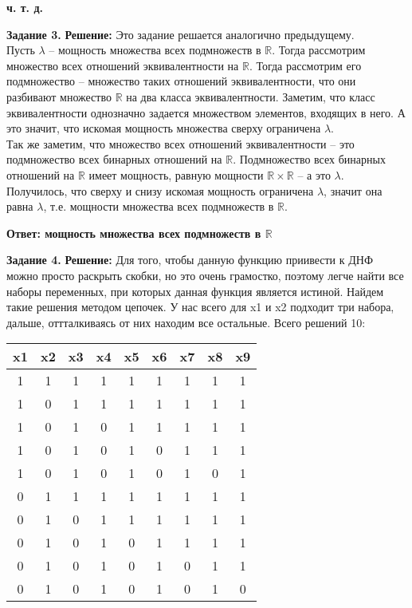 \documentclass[12pt,a4paper]{scrartcl}
\begin{document}
	\begin{flushright}	
		\textbf{ч. т. д.}
	\end{flushright}
	\textbf{Задание 3.} 
	\newline
	\textbf{Решение:} 
	\newline
	\indent
	Это задание решается аналогично предыдущему.\\
	Пусть $\lambda$ -- мощность множества всех подмножеств в $\mathbb{R}$. Тогда рассмотрим множество всех отношений эквивалентности на $\mathbb{R}$. Тогда рассмотрим его подмножество -- множество таких отношений эквивалентности, что они разбивают множество $\mathbb{R}$ на два класса эквивалентности. Заметим, что класс эквивалентности однозначно задается множеством элементов, входящих в него. А это значит, что искомая мощность множества сверху ограничена $\lambda$. \\
	Так же заметим, что множество всех отношений эквивалентности -- это подмножество всех бинарных отношений на $\mathbb{R}$. Подмножество всех бинарных отношений на $\mathbb{R}$ имеет мощность, равную мощности $\mathbb{R} \times \mathbb{R}$ -- а это
	$\lambda$.\\
	Получилось, что сверху и снизу искомая мощность ограничена $\lambda$, значит она равна $\lambda$, т.е. мощности множества всех подмножеств в $\mathbb{R}$.
	\begin{flushright}
		\textbf{Ответ: мощность множества всех подмножеств в $\mathbb{R}$}
	\end{flushright}
	\noindent
	\textbf{Задание 4.} 
	\newline
	\textbf{Решение:} 
	\newline
	\indent
	Для того, чтобы данную функцию приивести к ДНФ можно просто раскрыть скобки, но это очень грамостко, поэтому легче найти все наборы переменных, при которых данная функция является истиной. Найдем такие решения методом цепочек. У нас всего для x1 и x2 подходит три набора, дальше, оттталкиваясь от них находим все остальные. Всего решений 10:
	\renewcommand{\arraystretch}{1}
	\renewcommand{\tabcolsep}{0.5 cm}
	\begin{center}
		\begin{tabular}{|c|c|c|c|c|c|c|c|c|}
			\hline
			x1 & x2 & x3 & x4 & x5 & x6 & x7 & x8 & x9 \\
			\hline
			1& 1 & 1 & 1 & 1 & 1 & 1 & 1 & 1 \\ 
			\hline
			1& 0 & 1 & 1 & 1 & 1 & 1 & 1 & 1 \\ 
			\hline
			1& 0 & 1 & 0 & 1 & 1 & 1 & 1 & 1 \\ 
			\hline
			1& 0 & 1 & 0 & 1 & 0 & 1 & 1 & 1 \\ 
			\hline
			1& 0 & 1 & 0 & 1 & 0 & 1 & 0 & 1 \\ 
			\hline
			0& 1 & 1 & 1 & 1 & 1 & 1 & 1 & 1 \\ 
			\hline
			0& 1 & 0 & 1 & 1 & 1 & 1 & 1 & 1 \\ 
			\hline
			0& 1 & 0 & 1 & 0 & 1 & 1 & 1 & 1 \\ 
			\hline
			0& 1 & 0 & 1 & 0 & 1 & 0 & 1 & 1 \\ 
			\hline
			0& 1 & 0 & 1 & 0 & 1 & 0 & 1 & 0 \\ 
			\hline		
		\end{tabular}
	\end{center}
\end{document}
